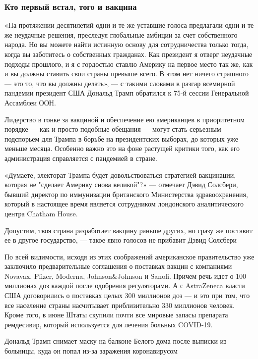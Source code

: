 \subsubsection{Кто первый встал, того и вакцина}

«На протяжении десятилетий одни и те же уставшие голоса предлагали одни и те же
неудачные решения, преследуя глобальные амбиции за счет собственного народа. Но
вы можете найти истинную основу для сотрудничества только тогда, когда вы
заботитесь о собственных гражданах. Как президент я отверг неудачные подходы
прошлого, и я с гордостью ставлю Америку на первое место так же, как и вы
должны ставить свои страны превыше всего. В этом нет ничего страшного — это то,
что вы должны делать», — с такими словами в разгар всемирной пандемии президент
США Дональд Трамп обратился к 75-й сессии Генеральной Ассамблеи ООН.

Лидерство в гонке за вакциной и обеспечение ею американцев в приоритетном
порядке — как и просто подобные обещания — могут стать серьезным подспорьем для
Трампа в борьбе на президентских выборах, до которых уже меньше месяца.
Особенно важно это на фоне растущей критики того, как его администрация
справляется с пандемией в стране.

«Думаете, электорат Трампа будет довольствоваться стратегией вакцинации,
которая не "сделает Америку снова великой"?» — отмечает Дэвид Солсбери, бывший
директор по иммунизации британского Министерства здравоохранения, который в
настоящее время является сотрудником лондонского аналитического центра Chatham
House.

Допустим, твоя страна разработает вакцину раньше других, но сразу же поставит
ее в другое государство, — такое явно голосов не прибавит Дэвид Солсбери

По всей видимости, исходя из этих соображений американское правительство уже
заключило предварительные соглашения о поставках вакцин с компаниями Novavax,
Pfizer, Moderna, Johnson\&Johnson и Sanofi. Причем речь идет о 100 миллионах
доз каждой после одобрения регуляторами. А с AstraZeneca власти США
договорились о поставках целых 300 миллионов доз — и это при том, что все
население страны насчитывает приблизительно 330 миллионов человек. Кроме того,
в июне Штаты скупили почти все мировые запасы препарата ремдесивир, который
используется для лечения больных COVID-19.

Дональд Трамп снимает маску на балконе Белого дома после выписки из больницы,
куда он попал из-за заражения коронавирусом


